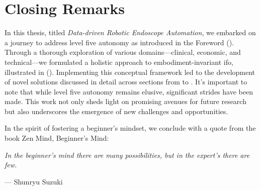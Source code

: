 \section{Closing Remarks}

In this thesis, titled \textit{Data-driven Robotic Endoscope Automation}, we embarked on a journey to address level five autonomy as introduced in the Foreword (). Through a thorough exploration of various domains—clinical, economic, and technical—we formulated a holistic approach to embodiment-invariant \gls{ifo}, illustrated in  (). Implementing this conceptual framework led to the development of novel solutions discussed in detail across sections from  to . It's important to note that while level five autonomy remains elusive, significant strides have been made. This work not only sheds light on promising avenues for future research but also underscores the emergence of new challenges and opportunities.

In the spirit of fostering a beginner's mindset, we conclude with a quote from the book Zen Mind, Beginner's Mind:


\vspace*{\fill}
\begin{center}
\textit{In the beginner’s mind there are many possibilities, but in the expert’s there are few.}

\vspace{5mm}
\hspace{20mm} --- Shunryu Suzuki~\cite{beginnersmind}
\end{center}

